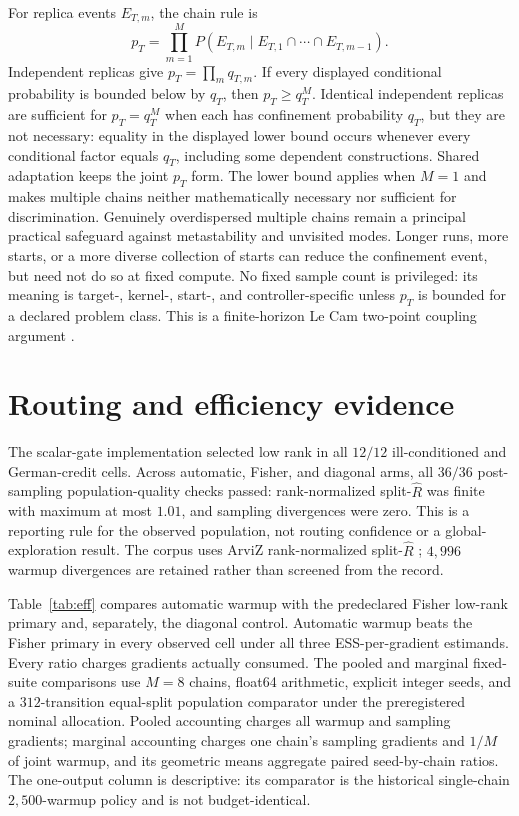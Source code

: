 \documentclass[11pt]{article}
\theoremstyle{plain}
\theoremstyle{definition}
\theoremstyle{remark}
\newcommand{\Rhat}{\widehat R}
\begin{document}
For replica events $E_{T,m}$, the chain rule is
\[
 p_T=\prod_{m=1}^M
 P(E_{T,m}\mid E_{T,1}\cap\cdots\cap E_{T,m-1}).
\]
Independent replicas give $p_T=\prod_m q_{T,m}$. If every displayed
conditional probability is bounded below by $q_T$, then
$p_T\ge q_T^M$. Identical independent replicas are sufficient for
$p_T=q_T^M$ when each has confinement probability $q_T$, but they are not
necessary: equality in the displayed lower bound occurs whenever every
conditional factor equals $q_T$, including some dependent constructions.
Shared adaptation keeps the joint $p_T$ form. The lower bound applies when
$M=1$ and makes multiple chains neither mathematically necessary nor
sufficient for discrimination. Genuinely overdispersed multiple chains remain
a principal practical safeguard against metastability and unvisited modes.
Longer runs, more starts, or a more diverse collection of starts can reduce the
confinement event, but need not do so at fixed compute.
No fixed sample count is privileged: its meaning is target-, kernel-, start-,
and controller-specific unless $p_T$ is bounded for a declared problem class.
This is a finite-horizon Le Cam two-point coupling argument
\citep{yu1997assouad}.

\section{Routing and efficiency evidence}\label{sec:efficiency}

The scalar-gate implementation selected low rank in all $12/12$
ill-conditioned and German-credit cells. Across automatic, Fisher, and
diagonal arms, all $36/36$ post-sampling population-quality checks passed:
rank-normalized split-$\Rhat$ was finite with maximum at most $1.01$, and
sampling divergences were zero. This is a reporting rule for the observed
population, not routing confidence or a global-exploration result. The corpus
uses ArviZ rank-normalized split-$\Rhat$ \citep{vehtari2021rank}; $4{,}996$
warmup divergences are retained rather than screened from the record.

Table~\ref{tab:eff} compares automatic warmup with the predeclared Fisher
low-rank primary and, separately, the diagonal control. Automatic warmup beats
the Fisher primary in every observed cell under all three ESS-per-gradient
estimands. Every ratio charges gradients actually consumed. The pooled and
marginal fixed-suite comparisons use $M=8$ chains, float64 arithmetic, explicit
integer seeds, and a $312$-transition equal-split population comparator under
the preregistered nominal allocation. Pooled accounting charges all warmup and
sampling gradients; marginal accounting charges one chain's sampling gradients
and $1/M$ of joint warmup, and its geometric means aggregate paired
seed-by-chain ratios. The one-output column is descriptive: its comparator is
the historical single-chain $2{,}500$-warmup policy and is not budget-identical.
\end{document}
